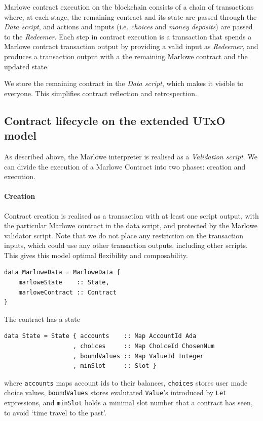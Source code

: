 \documentclass[runningheads]{llncs}
\begin{document}
\noindent
Marlowe contract execution on the blockchain consists of a chain of transactions
where, at each stage, the remaining contract and its state are passed through the \emph{Data script},
and actions and inputs (i.e. \emph{choices} and \emph{money deposits}) are passed to the %
\emph{Redeemer}.
Each step in contract execution is a transaction that spends a Marlowe contract transaction output
by providing a valid input as \emph{Redeemer}, and produces a transaction output
with a the remaining Marlowe contract and the updated state.

We store the remaining contract in the \emph{Data script}, which makes it visible to everyone.
This simplifies contract reflection and retrospection.

\subsection{Contract lifecycle on the extended UTxO model}

As described above, the Marlowe interpreter is realised as a \emph{Validation script}.
We can divide the execution of a Marlowe Contract into two phases:
creation and execution.

\paragraph{Creation}

Contract creation is realised as a transaction
with at least one script output,
with the particular Marlowe contract in the data script, and protected by the Marlowe validator script.
Note that we do not place any restriction on the transaction inputs, which could use any other transaction
outputs, including other scripts. This gives this model optimal flexibility and composability.

\begin{verbatim}
data MarloweData = MarloweData {
    marloweState    :: State,
    marloweContract :: Contract
}
\end{verbatim}
\noindent
The contract has a state

\begin{verbatim}
data State = State { accounts    :: Map AccountId Ada
                   , choices     :: Map ChoiceId ChosenNum
                   , boundValues :: Map ValueId Integer
                   , minSlot     :: Slot }
\end{verbatim}

\noindent%
where \texttt{accounts} maps account ids to their balances, \texttt{choices} stores user made choice values,
\texttt{boundValues} stores evalutated \texttt{Value}'s introduced by \texttt{Let} expressions,
and \texttt{minSlot} holds a minimal slot number that a contract has seen, to avoid `time travel to the past'.
\end{document}
